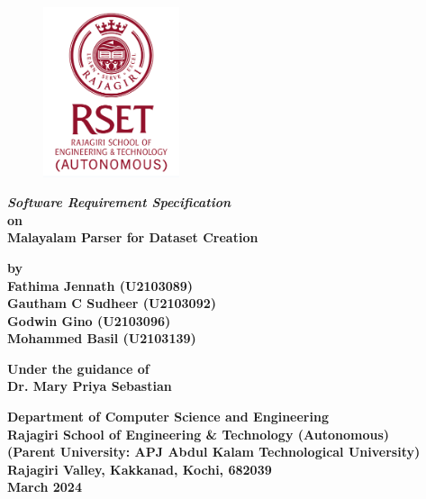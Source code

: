 \documentclass[12pt]{article}
\begin{document}
	
	
	\begin{figure}[t]
		\centering
		\includegraphics[width=4cm]{RSET.png}
		\bigskip
	\end{figure}
	
	
	\begin{center}
		
		
		\textbf{\textit{
				{\fontsize{16pt}{19.2pt}\selectfont
					Software Requirement Specification}}\medskip
			{\fontsize{14pt}{16.8pt}\selectfont
				\\on\medskip\\Malayalam Parser for Dataset Creation}
		}
		
		
		\vspace{1cm}
		
		
		{\fontsize{14pt}{16.8pt}\selectfont
			\textbf{
				by\\
				Fathima Jennath (U2103089)\\
				Gautham C Sudheer (U2103092)\\
				Godwin Gino (U2103096)\\
				Mohammed Basil (U2103139)
			}
			
			\vspace{2cm}
			
			
			\textbf{
				Under the guidance of\\
				Dr. Mary Priya Sebastian\\
			}
			
			\bigskip
			
			
			\textbf{
				Department of Computer Science and Engineering\\
				Rajagiri School of Engineering \& Technology (Autonomous)\\
				(Parent University: APJ Abdul Kalam Technological University)\\
				Rajagiri Valley, Kakkanad, Kochi, 682039\\
				March 2024
			}
		}   
		
	\end{center}
	
\end{document}
